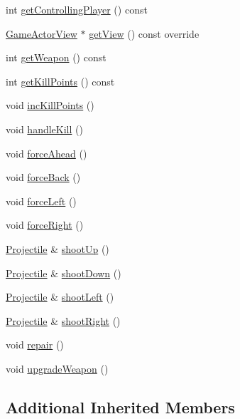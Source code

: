 \begin{DoxyCompactItemize}
\item 
int \hyperlink{class_spacecraft_a9c5a89e4cf64d6fca1cfbd3f2fe6be2e}{get\+Controlling\+Player} () const 
\item 
\hyperlink{class_game_actor_view}{Game\+Actor\+View} $\ast$ \hyperlink{class_spacecraft_ada8aff4825d826f3b8ab6ef3b4430529}{get\+View} () const override
\item 
int \hyperlink{class_spacecraft_ac24eafbec6b3b2a57b9f0ab359d38e56}{get\+Weapon} () const 
\item 
int \hyperlink{class_spacecraft_a3e86b132718ae9644846005f0368d65e}{get\+Kill\+Points} () const 
\item 
void \hyperlink{class_spacecraft_a47aa7a1409fbd782a9cc8fe172f9514b}{inc\+Kill\+Points} ()
\item 
void \hyperlink{class_spacecraft_a4609f3428987bc61e490519a8d1b9ccb}{handle\+Kill} ()
\item 
void \hyperlink{class_spacecraft_a9f5f90ddf116970b2e0c194a5504aa76}{force\+Ahead} ()
\item 
void \hyperlink{class_spacecraft_ac425b3e98e397f522bed99559c88eac2}{force\+Back} ()
\item 
void \hyperlink{class_spacecraft_a43ae565de6dbc6cc337f42e408ad363d}{force\+Left} ()
\item 
void \hyperlink{class_spacecraft_a6146562c8ee95b71070108f30afdfc1d}{force\+Right} ()
\item 
\hyperlink{class_projectile}{Projectile} \& \hyperlink{class_spacecraft_a89125988749b1ee29bf1d3f186bc7dd6}{shoot\+Up} ()
\item 
\hyperlink{class_projectile}{Projectile} \& \hyperlink{class_spacecraft_a611409c0d69415ada78ed98d187f0e34}{shoot\+Down} ()
\item 
\hyperlink{class_projectile}{Projectile} \& \hyperlink{class_spacecraft_a904607a42543375dd596aadeef7a5ce4}{shoot\+Left} ()
\item 
\hyperlink{class_projectile}{Projectile} \& \hyperlink{class_spacecraft_a7c626770ca1f4aa24229e72756150f2d}{shoot\+Right} ()
\item 
void \hyperlink{class_spacecraft_a42787ac2585d1826a3471fe38fdce9ae}{repair} ()
\item 
void \hyperlink{class_spacecraft_a41213c1017029fb0ff4c5d9b62b1591f}{upgrade\+Weapon} ()
\end{DoxyCompactItemize}
\subsection*{Additional Inherited Members}


